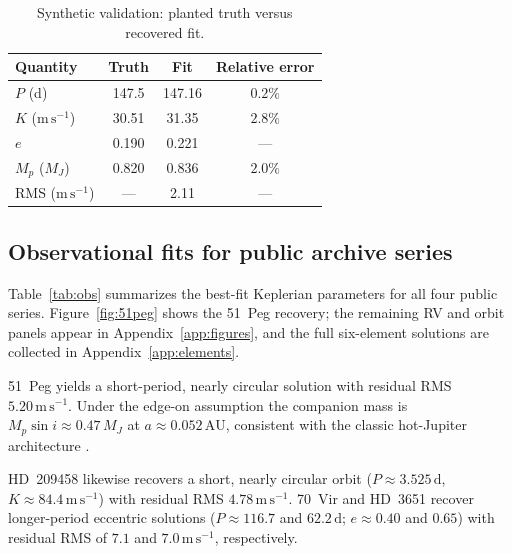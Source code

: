 \documentclass[11pt]{article}
\begin{document}
\begin{table}[H]
\centering
\caption{Synthetic validation: planted truth versus recovered fit.}
\label{tab:synthetic}
\begin{tabular}{@{}lccc@{}}
\toprule
Quantity & Truth & Fit & Relative error \\
\midrule
$P$ (d) & 147.5 & 147.16 & $0.2\%$ \\
$K$ ($\mathrm{m\,s^{-1}}$) & 30.51 & 31.35 & $2.8\%$ \\
$e$ & 0.190 & 0.221 & --- \\
$M_p$ ($M_J$) & 0.820 & 0.836 & $2.0\%$ \\
RMS ($\mathrm{m\,s^{-1}}$) & --- & 2.11 & --- \\
\bottomrule
\end{tabular}
\end{table}


\subsection{Observational fits for public archive series}

Table~\ref{tab:obs} summarizes the best-fit Keplerian parameters for all four
public series. Figure~\ref{fig:51peg} shows the 51~Peg recovery; the remaining
RV and orbit panels appear in Appendix~\ref{app:figures}, and the full
six-element solutions are collected in Appendix~\ref{app:elements}.

51~Peg yields a short-period, nearly circular solution with residual RMS
$5.20\,\mathrm{m\,s^{-1}}$. Under the edge-on
assumption the companion mass is
$M_p\sin i \approx 0.47\,M_J$ at
$a \approx 0.052\,\mathrm{AU}$, consistent with
the classic hot-Jupiter architecture
\citep{mayor1995jupiter,marcy1997peg}.

HD~209458 likewise recovers a short, nearly circular orbit
($P \approx 3.525\,\mathrm{d}$,
$K \approx 84.4\,\mathrm{m\,s^{-1}}$) with
residual RMS $4.78\,\mathrm{m\,s^{-1}}$.
70~Vir and HD~3651 recover longer-period eccentric solutions
($P \approx 116.7$ and
$62.2\,\mathrm{d}$; $e \approx 0.40$
and $0.65$) with residual RMS of
$7.1$ and
$7.0\,\mathrm{m\,s^{-1}}$, respectively.
\end{document}
